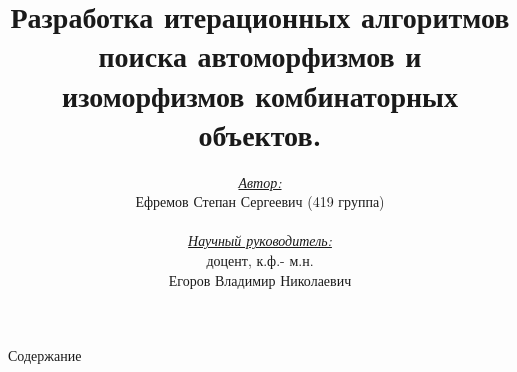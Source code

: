 \documentclass{beamer}
\begin{document}
\title{Разработка итерационных алгоритмов поиска автоморфизмов
и изоморфизмов комбинаторных объектов.}


\author{\textit{\underline{Автор:}}\\ Ефремов Степан Сергеевич (419 группа)\\ \\
\textit{\underline {Научный руководитель:}}\\ доцент, к.ф.- м.н.\\ Егоров Владимир Николаевич}

\date{}



\begin{frame}{}
\titlepage
\end{frame}


\begin{frame}{Содержание}
\tableofcontents
\end{frame} 
\end{document}
